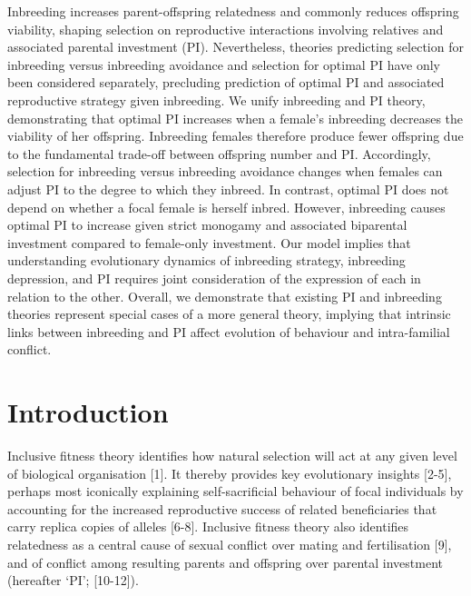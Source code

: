 \documentclass[12pt]{article}
\begin{document}
Inbreeding increases parent-offspring relatedness and commonly reduces offspring viability, shaping selection on reproductive interactions involving relatives and associated parental investment (PI). Nevertheless, theories predicting selection for inbreeding versus inbreeding avoidance and selection for optimal PI have only been considered separately, precluding prediction of optimal PI and associated reproductive strategy given inbreeding. We unify inbreeding and PI theory, demonstrating that optimal PI increases when a female's inbreeding decreases the viability of her offspring. Inbreeding females therefore produce fewer offspring due to the fundamental trade-off between offspring number and PI. Accordingly, selection for inbreeding versus inbreeding avoidance changes when females can adjust PI to the degree to which they inbreed. In contrast, optimal PI does not depend on whether a focal female is herself inbred. However, inbreeding causes optimal PI to increase given strict monogamy and associated biparental investment compared to female-only investment. Our model implies that understanding evolutionary dynamics of inbreeding strategy, inbreeding depression, and PI requires joint consideration of the expression of each in relation to the other. Overall, we demonstrate that existing PI and inbreeding theories represent special cases of a more general theory, implying that intrinsic links between inbreeding and PI affect evolution of behaviour and intra-familial conflict.


\section*{Introduction}

Inclusive fitness theory identifies how natural selection will act at any given level of biological organisation [1]. It thereby provides key evolutionary insights [2-5], perhaps most iconically explaining self-sacrificial behaviour of focal individuals by accounting for the increased reproductive success of related beneficiaries that carry replica copies of alleles [6-8]. Inclusive fitness theory also identifies relatedness as a central cause of sexual conflict over mating and fertilisation [9], and of conflict among resulting parents and offspring over parental investment (hereafter `PI'; [10-12]). 
\end{document}
